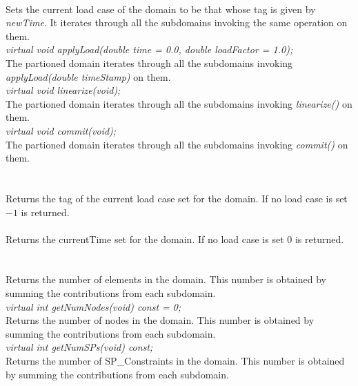  \\
Sets the current load case of the domain to be that whose tag is given
by {\em newTime}. It iterates through all the subdomains invoking the
same operation on them. \\

{\em virtual void applyLoad(double time = 0.0, double loadFactor
= 1.0);} \\
The partioned domain iterates through all the subdomains invoking {\em
applyLoad(double timeStamp)} on them. \\

{\em virtual void linearize(void);} \\
The partioned domain iterates through all the subdomains invoking {\em
linearize()} on them. \\


{\em virtual void commit(void);} \\
The partioned domain iterates through all the subdomains invoking {\em
commit()} on them. \\

  \\
 \\
Returns the tag of the current load case set for the domain. If no
load case is set $-1$ is returned. \\

 \\
Returns the currentTime set for the domain. If no load case is set $0$
is returned. \\ 

  \\
\\
Returns the number of elements in the domain. This number is obtained
by summing the contributions from each subdomain. \\

{\em virtual int getNumNodes(void) const = 0;}\\
Returns the number of nodes in the domain.
This number is obtained by summing the contributions from each subdomain. \\

{\em virtual int getNumSPs(void) const;}\\
Returns the number of SP\_Constraints in the domain. 
This number is obtained by summing the contributions from each subdomain. \\

